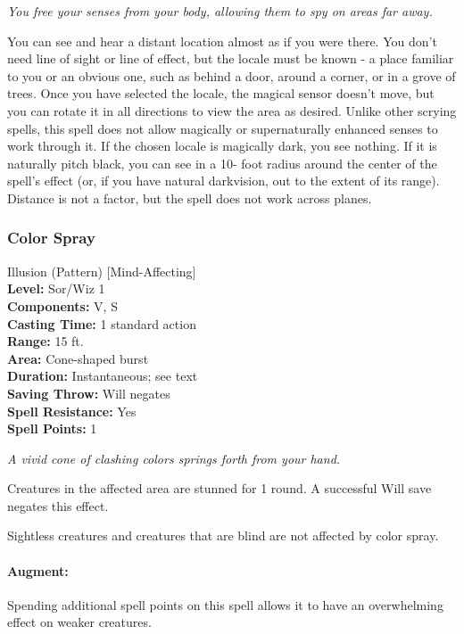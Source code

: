 \emph{You free your senses from your body, allowing them to spy on areas far away.}

You can see and hear a distant location almost as if you were there. 
You don't need line of sight or line of effect, but the locale must be known - 
a place familiar to you or an obvious one, such as behind a door, around a corner, or in a grove of trees. 
Once you have selected the locale, the magical sensor doesn't move, but you can rotate it in all directions to view the area as desired. 
Unlike other scrying spells, this spell does not allow magically or supernaturally enhanced senses to work through it.
If the chosen locale is magically dark, you see nothing. 
If it is naturally pitch black, 
you can see in a 10- foot radius around the center of the spell's effect (or, if you have natural darkvision, out to the extent of its range). 
Distance is not a factor, but the spell does not work across planes.

\subsubsection{Color Spray}
\label{Spell:ColorSpray}
Illusion (Pattern) [Mind-Affecting]
\\ \textbf{Level:} Sor/Wiz 1
\\ \textbf{Components:} V, S
\\ \textbf{Casting Time:} 1 standard action
\\ \textbf{Range:} 15 ft.
\\ \textbf{Area:} Cone-shaped burst
\\ \textbf{Duration:} Instantaneous; see text
\\ \textbf{Saving Throw:} Will negates
\\ \textbf{Spell Resistance:} Yes
\\ \textbf{Spell Points:} 1

\emph{A vivid cone of clashing colors springs forth from your hand.}

Creatures in the affected area are stunned for 1 round.
A successful Will save negates this effect.

Sightless creatures and creatures that are blind are not affected by color spray.

\paragraph{Augment:} Spending additional spell points on this spell allows it to have an overwhelming effect on weaker creatures.

